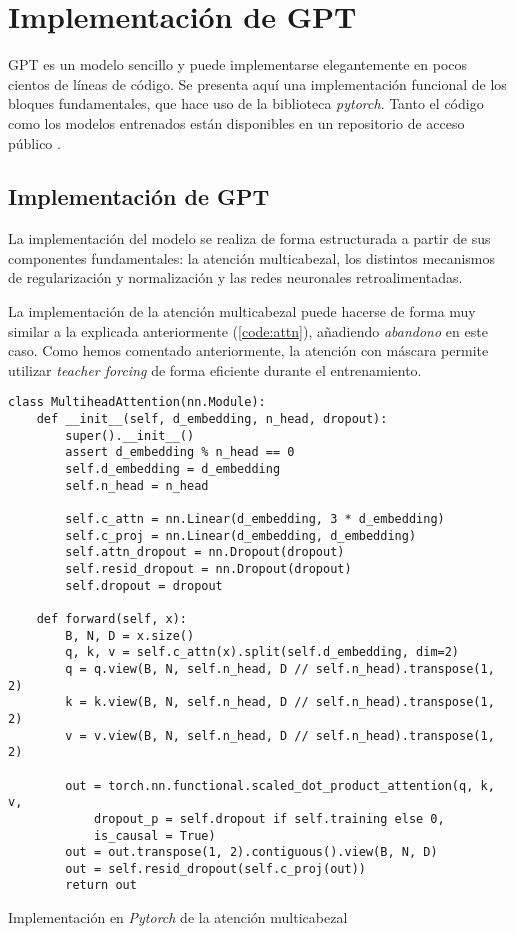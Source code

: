 \chapter{Implementación de GPT} \label{appendixA}
GPT es un modelo sencillo y puede implementarse elegantemente en pocos cientos de líneas de código. Se presenta aquí una implementación funcional de los bloques fundamentales, que hace uso de la biblioteca \textit{pytorch}. Tanto el código como los modelos entrenados están disponibles en un repositorio de acceso público \cite{githubrepo}.

\section{Implementación de GPT}
La implementación del modelo se realiza de forma estructurada a partir de sus componentes fundamentales: la atención multicabezal, los distintos mecanismos de regularización y normalización y las redes neuronales retroalimentadas.

La implementación de la atención multicabezal puede hacerse de forma muy similar a la explicada anteriormente (\cref{code:attn}), añadiendo \textit{abandono} en este caso. Como hemos comentado anteriormente, la atención con máscara permite utilizar \textit{teacher forcing} de forma eficiente durante el entrenamiento.

\begin{code}
\begin{verbatim}
class MultiheadAttention(nn.Module):
    def __init__(self, d_embedding, n_head, dropout):
        super().__init__()
        assert d_embedding % n_head == 0
        self.d_embedding = d_embedding
        self.n_head = n_head

        self.c_attn = nn.Linear(d_embedding, 3 * d_embedding)
        self.c_proj = nn.Linear(d_embedding, d_embedding)
        self.attn_dropout = nn.Dropout(dropout)
        self.resid_dropout = nn.Dropout(dropout)
        self.dropout = dropout

    def forward(self, x):
        B, N, D = x.size()
        q, k, v = self.c_attn(x).split(self.d_embedding, dim=2)
        q = q.view(B, N, self.n_head, D // self.n_head).transpose(1, 2)
        k = k.view(B, N, self.n_head, D // self.n_head).transpose(1, 2)
        v = v.view(B, N, self.n_head, D // self.n_head).transpose(1, 2)

        out = torch.nn.functional.scaled_dot_product_attention(q, k, v,
            dropout_p = self.dropout if self.training else 0,
            is_causal = True)
        out = out.transpose(1, 2).contiguous().view(B, N, D)
        out = self.resid_dropout(self.c_proj(out))
        return out
\end{verbatim}
\caption{Implementación en \textit{Pytorch} de la atención multicabezal}
\label{code:attn}
\end{code}

